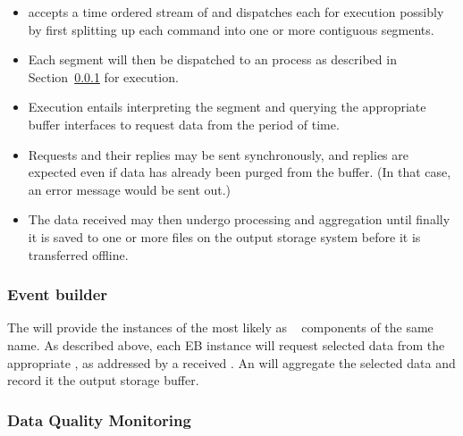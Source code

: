 \begin{itemize}
\item {} accepts a time ordered stream of  and dispatches each for execution possibly by first splitting up each command into one or more contiguous segments.
\item Each segment will then be dispatched to an  process as described in Section~\ref{sec:fd-daq:design-event-builder} for execution.
\item Execution entails interpreting the  segment and querying the appropriate  buffer interfaces to request data from the period of time. 
\item Requests and their replies may be sent synchronously, and
  replies are expected even if data has already been purged from the
   buffer. (In that case, an error message would be sent out.)
\item The data received may then undergo processing and aggregation
  until finally it is saved to one or more files on the output storage
  system before it is transferred offline.
\end{itemize}



\subsubsection{Event builder}
\label{sec:fd-daq:design-event-builder}


The  will provide the instances of the  most likely as ~\cite{artdaq} components of the same name.
As described above, each EB instance will request selected data from
the appropriate , as addressed by a received . 
An  will aggregate the selected data and record it the output storage buffer.



\subsubsection{Data Quality Monitoring}
\label{sec:fd-daq:design-data-quality}

